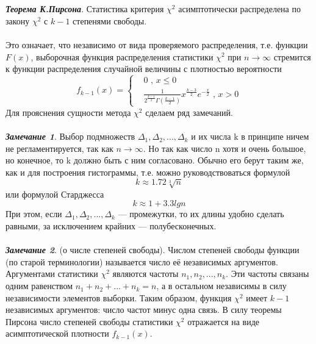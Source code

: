 \documentclass[a4paper,14pt]{article}
\begin{document}
	\\\\
	\textbf{\textit{Теорема К.Пирсона}}. Статистика критерия $\chi^{2}$ асимптотически распределена по закону $\chi^{2}$ с $k-1$ степенями свободы.
	\\\\
	Это означает, что независимо от вида проверяемого распределения, т.е. функции $F(x)$, выборочная функция распределения статистики $\chi^{2}$ при $n \rightarrow \infty$  стремится к функции распределения случайной величины с плотностью вероятности 
	\begin{equation}
		f_{k - 1}(x) = 
		\begin{cases}
			& 0 \text{ , } x  \leq 0  \\ 
			& \frac{1}{2^{\frac{k-1}{2}}\Gamma(\frac{k-1}{2})}x^{\frac{k-3}{2}}e^{-\frac{x}{2}}
			\text{ , } x>0 
		\end{cases}
		\label{f_k-1}
	\end{equation}
	Для прояснения сущности метода $\chi^{2}$ сделаем ряд замечаний.
	\\\\
	\textbf{\textit{Замечание 1}}. Выбор подмножеств $\Delta_{1},\Delta_{2}, ... ,\Delta_{k}$ и их числа k в принципе ничем не регламентируется, так как $n \rightarrow \infty$. Но так как число n хотя и очень большое, но конечное, то k должно быть с ним согласовано. Обычно его берут таким же, как и для построения гистограммы, т.е. можно руководствоваться формулой
	\begin{equation}
		k \approx 1.72\sqrt[3]{n}
		\label{k_1}
	\end{equation}
	или формулой Старджесса
	\begin{equation}
		k \approx 1 + 3.3lgn
	\end{equation}
	При этом, если  $\Delta_{1},\Delta_{2}, ... ,\Delta_{k}$ — промежутки, то их длины удобно сделать равными, за исключением крайних — полубесконечных.
	\\\\
	\textbf{\textit{Замечание 2}}. (о числе степеней свободы).
	Числом степеней свободы функции (по старой терминологии) называется число её независимых аргументов. Аргументами статистики $\chi^{2}$ являются частоты $n_{1},n_{2}, ... ,n_{k}$. Эти частоты связаны одним равенством $n_{1} + n_{2} + ... + n_{k}  = n$, а в остальном независимы в силу независимости элементов выборки. Таким образом, функция $\chi^{2}$  имеет $k-1$ независимых аргументов: число частот минус одна связь. В силу теоремы Пирсона число степеней свободы статистики $\chi^{2}$  отражается на виде асимптотической плотности $f_{k - 1}(x)$.
\end{document}
